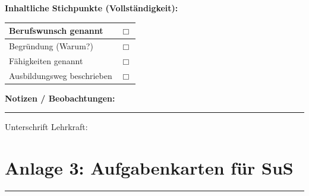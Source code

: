 \documentclass[11pt,a4paper]{article}
\begin{document}
\vspace{1em}

\textbf{Inhaltliche Stichpunkte (Vollständigkeit):}

\begin{tabular}{|l|c|}
\hline
Berufswunsch genannt & $\Box$ \\
\hline
Begründung (Warum?) & $\Box$ \\
\hline
Fähigkeiten genannt & $\Box$ \\
\hline
Ausbildungsweg beschrieben & $\Box$ \\
\hline
\end{tabular}

\vspace{1em}

\textbf{Notizen / Beobachtungen:}

\vspace{4cm}

\hrule

\vspace{0.5em}
Unterschrift Lehrkraft: \underline{\hspace{6cm}}

\newpage

\section*{Anlage 3: Aufgabenkarten für SuS}

\vspace{1em}
\hrule
\vspace{1em}
\end{document}

